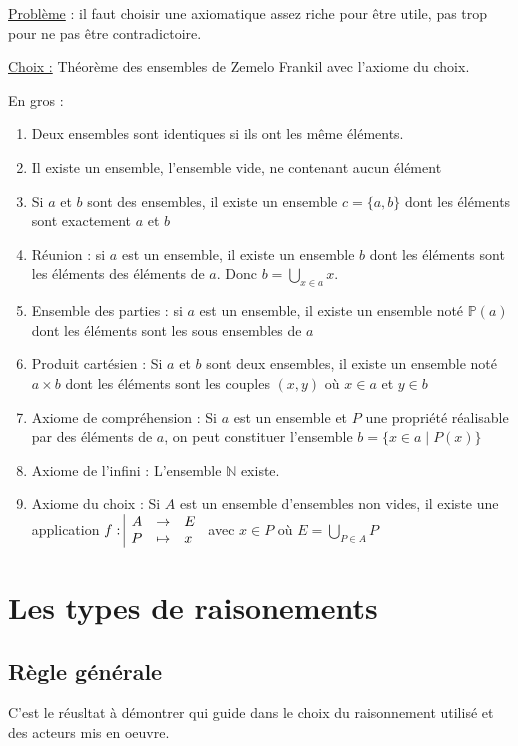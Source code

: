 \documentclass{prepacours}
\begin{document}
\underline{Problème} : il faut choisir une axiomatique assez riche pour être utile, 
pas trop pour ne pas être contradictoire. 

\underline{Choix :} Théorème des ensembles de Zemelo Frankil avec l'axiome du choix.

En gros : 

\begin{enumerate}
    \item Deux ensembles sont identiques si ils ont les même éléments. 
    \item Il existe un ensemble, l'ensemble vide, ne contenant aucun élément
    \item Si $a$ et $b$ sont des ensembles, il existe un ensemble $c = \{a, b\}$
            dont les éléments sont exactement $a$ et $b$
    \item Réunion : si $a$ est un ensemble, il existe un ensemble $b$ dont les éléments
        sont les éléments des éléments de $a$. Donc $b = \bigcup_{x \in a} x$.
    \item Ensemble des parties : si $a$ est un ensemble, il existe un ensemble noté
        $\mathbb P(a)$ dont les éléments sont les sous ensembles de $a$
    \item Produit cartésien : Si $a$ et $b$ sont deux ensembles, il existe un ensemble
        noté $a \times b$ dont les éléments sont les couples $(x, y)$ où $x \in a$ 
        et $y \in b$
    \item Axiome de compréhension : Si $a$ est un ensemble et $P$ une propriété réalisable
        par des éléments de $a$, on peut constituer l'ensemble $b = \{x \in a \mid P(x)\}$
    \item Axiome de l'infini : L'ensemble $\mathbb N$ existe.
    \item Axiome du choix : Si $A$ est un ensemble d'ensembles non vides, il existe une 
        application $f: \space \begin{array}{|rcl} A & \to & E \\ P & \mapsto & x \end{array}$ avec $x \in P$ où $E = \bigcup_{P \in A} P$
\end{enumerate}

\section{Les types de raisonements}

\subsection{Règle générale}

C'est le réusltat à démontrer qui guide dans le choix du raisonnement utilisé et des
acteurs mis en oeuvre. 
\end{document}
